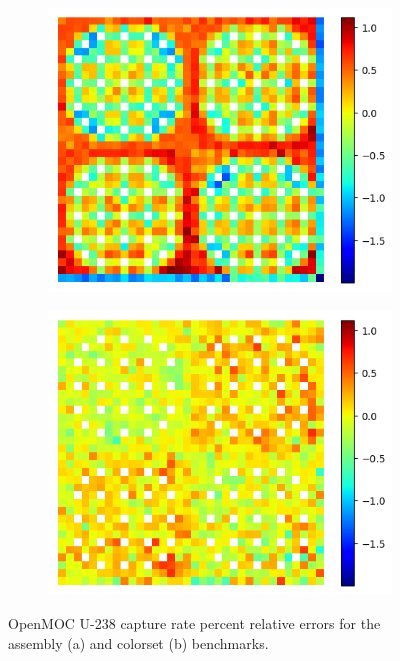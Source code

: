 \begin{figure}[h!]
\begin{subfigure}{0.45\textwidth}
  \centering
  \includegraphics[width=\linewidth]{figures/reflector/capt-null-errors}
  \caption{}
  \label{fig:reflector-capt-null-error}
\end{subfigure}%
\begin{subfigure}{0.45\textwidth}
  \centering
  \includegraphics[width=\linewidth]{figures/reflector/capt-degenerate-errors}
  \caption{}
  \label{fig:reflector-capt-degen-error}
\end{subfigure}
\caption{OpenMOC U-238 capture rate percent relative errors for the assembly (a) and colorset (b) benchmarks.}
\label{fig:capt-errors}
\end{figure}